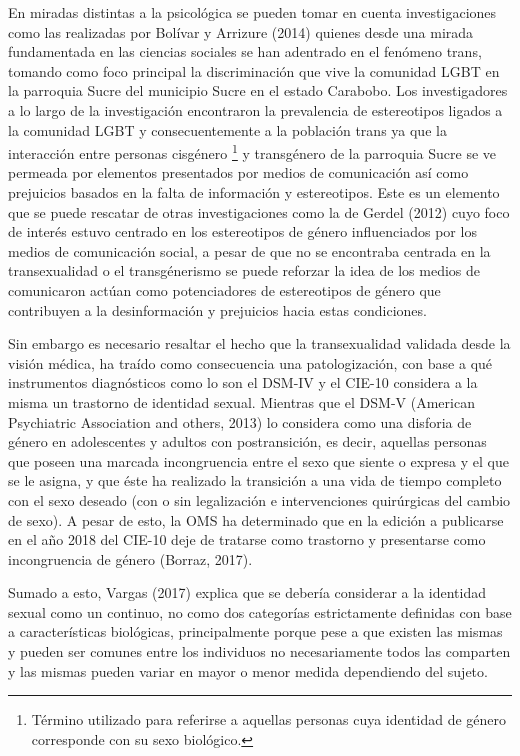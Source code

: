 En miradas distintas a la psicológica se pueden tomar en cuenta investigaciones
como las realizadas por Bolívar y Arrizure (2014) quienes desde una mirada
fundamentada en las ciencias sociales se han adentrado en el fenómeno trans,
tomando como foco principal la discriminación que vive la comunidad LGBT en la
parroquia Sucre del municipio Sucre en el estado Carabobo.
Los investigadores a lo largo de la investigación encontraron la prevalencia de
estereotipos ligados a la comunidad LGBT y consecuentemente a la población trans
ya que la interacción entre personas cisgénero
\footnote{Término utilizado para referirse a aquellas personas cuya identidad
de género corresponde con su sexo biológico.}
y transgénero de la parroquia
Sucre se ve permeada por elementos presentados por medios de comunicación así
como prejuicios basados en la falta de información y estereotipos.
Este es un elemento que se puede rescatar de otras investigaciones como la de
Gerdel (2012) cuyo foco de interés estuvo centrado en los estereotipos de género
influenciados por los medios de comunicación social, a pesar de que no se
encontraba centrada en la transexualidad o el transgénerismo se puede reforzar
la idea de los medios de comunicaron actúan como potenciadores de estereotipos
de género que contribuyen a la desinformación y prejuicios hacia estas
condiciones.

Sin embargo es necesario resaltar el hecho que la transexualidad validada desde
la visión médica, ha traído como consecuencia una patologización, con base a qué
instrumentos diagnósticos como lo son el DSM-IV y el CIE-10 considera a la
misma un trastorno de identidad sexual.
Mientras que el DSM-V (American Psychiatric Association and others, 2013) lo
considera como una disforia de género en adolescentes y adultos con
postransición, es decir, aquellas personas que poseen una marcada
incongruencia entre el sexo que siente o expresa y el que se le asigna, y que
éste ha realizado la transición a una vida de tiempo completo con el sexo
deseado (con o sin legalización e intervenciones quirúrgicas del cambio de
sexo).
A pesar de esto, la OMS ha determinado que en la edición a publicarse en el año
2018 del CIE-10 deje de tratarse como trastorno y presentarse como incongruencia
de género (Borraz, 2017).

Sumado a esto, Vargas (2017) explica que se debería considerar a la identidad
sexual como un continuo, no como dos categorías estrictamente definidas con base
a características biológicas, principalmente porque pese a que existen las
mismas y pueden ser comunes entre los individuos no necesariamente todos las
comparten y las mismas pueden variar en mayor o menor medida dependiendo del
sujeto.

